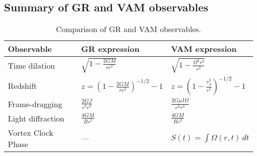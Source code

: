 \subsection*{Summary of GR and VAM observables}

\begin{table}[h!]
    \centering
    \begin{tabular}{lll}
        \toprule
        \textbf{Observable} & \textbf{GR expression} & \textbf{VAM expression} \\
        \midrule
        Time dilation & $\sqrt{1-\frac{2GM}{rc^2}}$ & $\sqrt{1-\frac{\Omega^2 r^2}{c^2}}$\\[0.5em]
        Redshift & $z=\left(1-\frac{2GM}{rc^2}\right)^{-1/2}-1$ & $z=\left(1-\frac{v_\phi^2}{c^2}\right)^{-1/2}-1$\\[0.5em]
        Frame-dragging & $\frac{2GJ}{c^2 r^3}$ & $\frac{2G\mu I\Omega}{c^2 r^3}$\\[0.5em]
        Light diffraction & $\frac{4GM}{Rc^2}$ & $\frac{4GM}{Rc^2}$\\
        Vortex Clock Phase & — & $S(t) = \int \Omega(r,t)\, dt$ \\
        \bottomrule
    \end{tabular}
    \caption{Comparison of GR and VAM observables.}
    \label{tab:equations}
\end{table}
